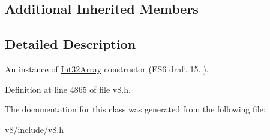 \subsection*{Additional Inherited Members}


\subsection{Detailed Description}
An instance of \mbox{\hyperlink{classv8_1_1Int32Array}{Int32\+Array}} constructor (E\+S6 draft 15..). 

Definition at line 4865 of file v8.\+h.



The documentation for this class was generated from the following file\+:\begin{DoxyCompactItemize}
\item 
v8/include/v8.\+h\end{DoxyCompactItemize}
